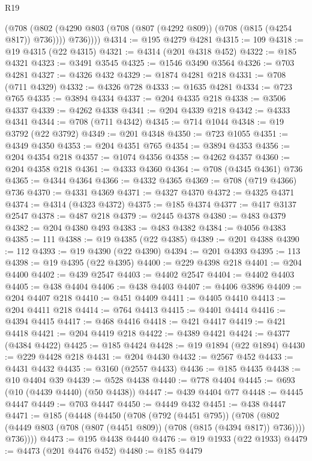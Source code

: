 \begin{lexlean}{R19}
\begin{coremodule}
{{{{{{{{{{{          (@708
            (@802 (@4290 @803 (@708 (@807 (@4292 @809)) (@708 (@815 (@4254 @817)) @736))))
            @736))))
@4314 := @195 @4279 @4281
@4315 := 109
@4318 := @19 @4315 (@22 @4315)
@4321 := @4314 (@201 @4318 @452)
@4322 := @185 @4321
@4323 := @3491 @3545
@4325 := @1546 @3490 @3564
@4326 := @703 @4281
@4327 := @4326 @432
@4329 := @1874 @4281 @218
@4331 := @708 (@711 @4329)
@4332 := @4326 @728
@4333 := @1635 @4281
@4334 := @723 @765
@4335 := @3894 @4334
@4337 := @204 @4335 @218
@4338 := @3506 @4337
@4339 := @4262 @4338
@4341 := @204 @4339 @218
@4342 := @4333 @4341
@4344 := @708 (@711 @4342)
@4345 := @714 @1044
@4348 := @19 @3792 (@22 @3792)
@4349 := @201 @4348
@4350 := @723 @1055
@4351 := @4349 @4350
@4353 := @204 @4351 @765
@4354 := @3894 @4353
@4356 := @204 @4354 @218
@4357 := @1074 @4356
@4358 := @4262 @4357
@4360 := @204 @4358 @218
@4361 := @4333 @4360
@4364 := @708 (@4345 @4361) @736
@4365 := @4344 @4364
@4366 := @4332 @4365
@4369 := @708 (@719 @4366) @736
@4370 := @4331 @4369
@4371 := @4327 @4370
@4372 := @4325 @4371
@4374 := @4314 (@4323 @4372)
@4375 := @185 @4374
@4377 := @417 @3137 @2547
@4378 := @487 @218
@4379 := @2445 @4378
@4380 := @483 @4379
@4382 := @204 @4380 @493
@4383 := @483 @4382
@4384 := @4056 @4383
@4385 := 111
@4388 := @19 @4385 (@22 @4385)
@4389 := @201 @4388
@4390 := 112
@4393 := @19 @4390 (@22 @4390)
@4394 := @201 @4393
@4395 := 113
@4398 := @19 @4395 (@22 @4395)
@4400 := @229 @4398 @218
@4401 := @204 @4400
@4402 := @439 @2547
@4403 := @4402 @2547
@4404 := @4402 @4403
@4405 := @438 @4404
@4406 := @438 @4403
@4407 := @4406 @3896
@4409 := @204 @4407 @218
@4410 := @451 @4409
@4411 := @4405 @4410
@4413 := @204 @4411 @218
@4414 := @764 @4413
@4415 := @4401 @4414
@4416 := @4394 @4415
@4417 := @468 @4416
@4418 := @421 @4417
@4419 := @421 @4418
@4421 := @204 @4419 @218
@4422 := @4389 @4421
@4424 := @4377 (@4384 @4422)
@4425 := @185 @4424
@4428 := @19 @1894 (@22 @1894)
@4430 := @229 @4428 @218
@4431 := @204 @4430
@4432 := @2567 @452
@4433 := @4431 @4432
@4435 := @3160 (@2557 @4433)
@4436 := @185 @4435
@4438 := @10 @4404 @39
@4439 := @528 @4438
@4440 := @778 @4404
@4445 := @693 (@10 (@4439 @4440) (@50 @4438))
@4447 := @439 @4404 @77
@4448 := @4445 @4447
@4449 := @703 @4447
@4450 := @4449 @432
@4451 := @438 @4447
@4471 := @185
    (@4448
      (@4450
        (@708
          (@792 (@4451 @795))
          (@708
            (@802 (@4449 @803 (@708 (@807 (@4451 @809)) (@708 (@815 (@4394 @817)) @736))))
            @736))))
@4473 := @195 @4438 @4440
@4476 := @19 @1933 (@22 @1933)
@4479 := @4473 (@201 @4476 @452)
@4480 := @185 @4479
}}}}}}}}}}}
\end{coremodule}
\end{lexlean}
